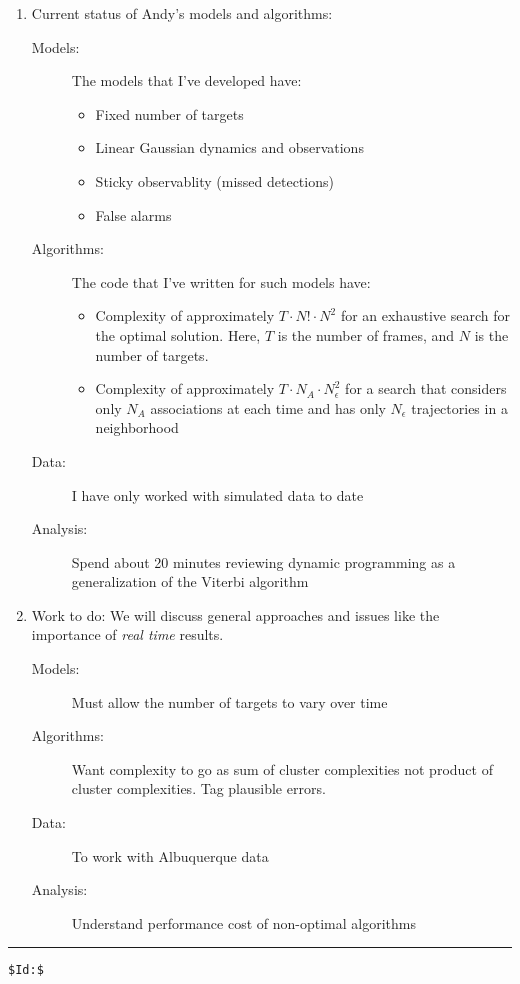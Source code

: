 \documentclass{article}
\begin{document}
\begin{enumerate}
\item Current status of Andy's models and algorithms:
  \begin{description}
  \item[Models:] The models that I've developed have:
    \begin{itemize}
    \item Fixed number of targets
    \item Linear Gaussian dynamics and observations
    \item Sticky observablity (missed detections)
    \item False alarms
    \end{itemize}
  \item[Algorithms:]  The code that I've written for such models have:
    \begin{itemize}
    \item Complexity of approximately $T\cdot N!\cdot N^2$ for an
      exhaustive search for the optimal solution.  Here, $T$ is the
      number of frames, and $N$ is the number of targets.
    \item Complexity of approximately $T\cdot N_A\cdot N_\epsilon^2$ for
      a search that considers only $N_A$ associations at each time
      and has only $N_\epsilon$ trajectories in a neighborhood
    \end{itemize}
  \item[Data:] I have only worked with simulated data to date
  \item[Analysis:] Spend about 20 minutes reviewing dynamic
    programming as a generalization of the Viterbi algorithm
  \end{description}
\item Work to do:
  We will discuss general approaches and issues like the importance of
  \emph{real time} results.
  \begin{description}
  \item[Models:] Must allow the number of targets to vary over time
  \item[Algorithms:] Want complexity to go as sum of cluster
    complexities not product of cluster complexities.  Tag plausible
    errors.
  \item[Data:] To work with Albuquerque data
  \item[Analysis:] Understand performance cost of non-optimal
    algorithms
  \end{description}
\end{enumerate}

\vfill \hrule
\begin{verbatim}
$Id:$
\end{verbatim}
\end{document}

